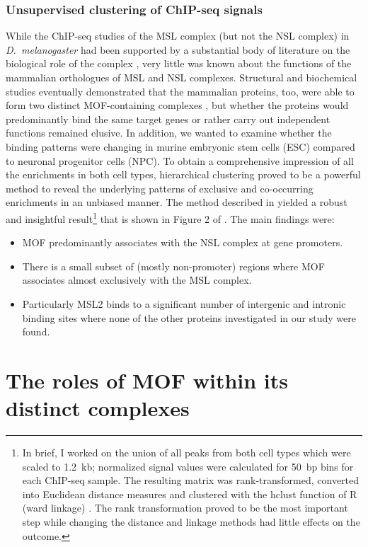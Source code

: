 \subsubsection{Unsupervised clustering of ChIP-seq signals}
While the ChIP-seq studies of the MSL complex (but not the NSL complex) in \textit{D.~melano\-gaster} had been supported by a substantial body of literature on the biological role of the complex \citep{Taipale2005}, very little was known about the functions of the mammalian orthologues of MSL and NSL complexes. Structural and biochemical studies eventually demonstrated that the mammalian proteins, too, were able to form two distinct MOF-containing complexes \citep{Kadlec2011,Hallacli2012,Dias2014,Ravens2014}, but whether the proteins would predominantly bind the same target genes or rather carry out independent functions remained elusive. In addition, we wanted to examine whether the binding patterns were changing in murine embryonic stem cells (ESC) compared to neuronal progenitor cells (NPC). To obtain a comprehensive impression of all the enrichments in both cell types, hierarchical clustering proved to be a powerful method to reveal the underlying patterns of exclusive and co-occurring enrichments in an unbiased manner. The method described in  yielded a robust and insightful result\footnote{In brief, I worked on the union of all peaks from both cell types which were scaled to 1.2~kb; normalized signal values were calculated for 50~bp bins for each ChIP-seq sample. The resulting matrix was rank-transformed, converted into Euclidean distance measures and clustered with the hclust function of R (ward linkage) \citep{R}. The rank transformation proved to be the most important step while changing the distance and linkage methods had little effects on the outcome.} that is shown in Figure 2 of .
%
The main findings were: 
\begin{itemize}[topsep=0pt]
\item MOF predominantly associates with the NSL complex at gene promoters.
\item There is a small subset of (mostly non-promoter) regions where MOF associates almost exclusively with the MSL complex.
\item Particularly MSL2 binds to a significant number of intergenic and intronic binding sites where none of the other proteins investigated in our study were found.
\end{itemize}
%
\section{The roles of MOF within its distinct complexes}

